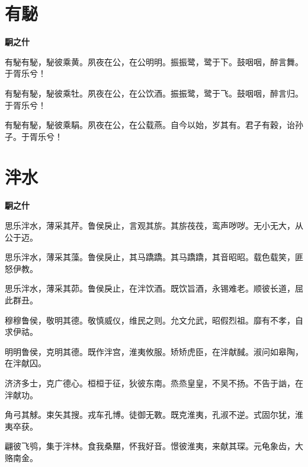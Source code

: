\documentclass[12pt,a4paper]{ctexbook}
\begin{document}
\section{有駜}
\textbf{駉之什}\par\vspace{0.5em}
有駜有駜，駜彼乘黄。夙夜在公，在公明明。振振鹭，鹭于下。鼓咽咽，醉言舞。于胥乐兮！\par
有駜有駜，駜彼乘牡。夙夜在公，在公饮酒。振振鹭，鹭于飞。鼓咽咽，醉言归。于胥乐兮！\par
有駜有駜，駜彼乘駽。夙夜在公，在公载燕。自今以始，岁其有。君子有穀，诒孙子。于胥乐兮！\par

\section{泮水}
\textbf{駉之什}\par\vspace{0.5em}
思乐泮水，薄采其芹。鲁侯戾止，言观其旂。其旂茷茷，鸾声哕哕。无小无大，从公于迈。\par
思乐泮水，薄采其藻。鲁侯戾止，其马蹻蹻。其马蹻蹻，其音昭昭。载色载笑，匪怒伊教。\par
思乐泮水，薄采其茆。鲁侯戾止，在泮饮酒。既饮旨酒，永锡难老。顺彼长道，屈此群丑。\par
穆穆鲁侯，敬明其德。敬慎威仪，维民之则。允文允武，昭假烈祖。靡有不孝，自求伊祜。\par
明明鲁侯，克明其德。既作泮宫，淮夷攸服。矫矫虎臣，在泮献馘。淑问如皋陶，在泮献囚。\par
济济多士，克广德心。桓桓于征，狄彼东南。烝烝皇皇，不吴不扬。不告于訩，在泮献功。\par
角弓其觩。束矢其搜。戎车孔博。徒御无斁。既克淮夷，孔淑不逆。式固尔犹，淮夷卒获。\par
翩彼飞鸮，集于泮林。食我桑黮，怀我好音。憬彼淮夷，来献其琛。元龟象齿，大赂南金。\par
\end{document}

